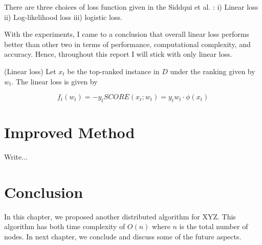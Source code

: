 There are three choices of loss function given in the Siddqui et al. \cite{10.1145/3219819.3220083}: i) Linear loss ii) Log-likelihood loss iii) logistic loss. 

With the experiments, I came to a conclusion that overall linear loss performs better than other two in terms of performance, computational complexity, and accuracy. Hence, throughout this report I will stick with only linear loss.

\begin{defn}
    \label{defn:linear-loss}
    (Linear loss)
    Let $x_t$ be the top-ranked instance in $D$ under the ranking given by $w_t$. The linear loss is given by 

    \vspace{-2em}
    \begin{equation}
        \label{eq:linear-loss}
        f_t(w_t) = -y_t SCORE(x_t;w_t) = y_t w_t \cdot \phi (x_t)
    \end{equation}
\end{defn}

\section{Improved Method}



Write...

\section{Conclusion}
In this chapter, we proposed another distributed algorithm for
XYZ. This algorithm has both time complexity of $O(n)$ where $n$
is the total number of nodes.  In next chapter, we conclude and
discuss some of the future aspects.

